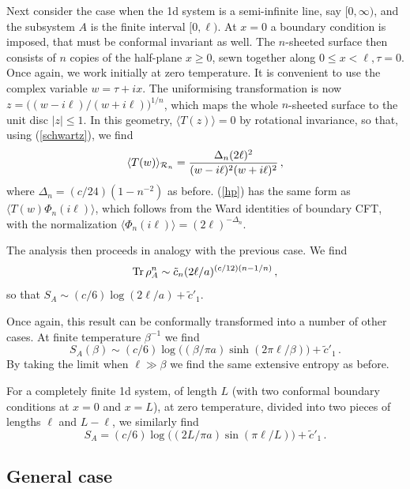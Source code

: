 \documentclass[12pt]{article}
\begin{document}
Next consider the case when the 1d system is a semi-infinite line,
say $[0,\infty)$, and the subsystem $A$ is the finite interval
$[0,\ell)$. 
At $x=0$ a boundary condition is imposed, that must be conformal invariant 
as well.
The $n$-sheeted surface then consists of $n$ copies
of the half-plane $x\geq0$, sewn together along $0\leq x<\ell, \tau=0$.
Once again, we work initially at zero temperature. It is convenient
to use the complex variable $w=\tau+ix$. The uniformising transformation
is now $z=\big((w-i\ell)/(w+i\ell)\big)^{1/n}$, which maps the whole
$n$-sheeted surface to the unit disc $|z|\leq1$. In this geometry, 
$\langle T(z)\rangle=0$ by rotational invariance, so that, using 
(\ref{schwartz}), we find
\begin{equation}
\label{hp}
\langle T(w)\rangle_{{\cal R}_n}=
{\Delta_n(2\ell)^2\over(w-i\ell)^2(w+i\ell)^2}\,,
\end{equation}
where $\Delta_n=(c/24)(1-n^{-2})$ as before. 
(\ref{hp}) has the same form as $\langle T(w)\Phi_n(i\ell)\rangle$,
which follows from the Ward identities of boundary CFT,\cite{confbook} 
with the normalization $\langle\Phi_n(i\ell)\rangle=(2\ell)^{-\Delta_n}$. 

The analysis then proceeds in analogy with the previous case. We find
\begin{equation}
{\rm Tr}\,\rho_{A}^n\sim \tilde c_n(2\ell/a)^{(c/12)(n-1/n)}\,,
\end{equation}
so that
$S_A\sim(c/6)\log(2\ell/a)+{\tilde c}'_1$. 

Once again, this result can be conformally transformed into a number of
other cases. At finite temperature $\beta^{-1}$ we find
\begin{equation}
S_A(\beta)\sim(c/6)\log\big((\beta/\pi a)\sinh(2\pi\ell/\beta)\big)+
{\tilde c}'_1\,.
\end{equation}
By taking the limit when $\ell\gg\beta$ we find the same extensive
entropy as before. 

For a completely finite 1d system, of length $L$ (with two conformal boundary 
conditions at $x=0$ and $x=L$), at zero temperature, divided into two pieces 
of lengths $\ell$ and $L-\ell$, we similarly find
\begin{equation}
S_A=(c/6)\log\big((2L/\pi a)\sin(\pi\ell/L)\big)+{\tilde c}'_1\,.
\end{equation}

\subsection{General case}
\end{document}
